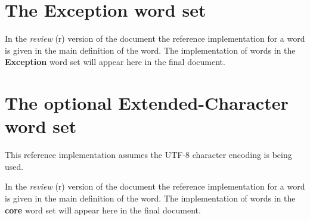 

\section{The Exception word set} %
\ifinline
	\begin{editor}
		In the \emph{review} (r) version of the document the
		reference implementation for a word is given in the main
		definition of the word.  The implementation of words in
		the \textbf{Exception} word set will appear here in the final
		document.
	\end{editor}
\else
	
\fi


\section{The optional Extended-Character word set} %
\label{imp:xchar}

This reference implementation assumes the UTF-8 character encoding
is being used.

\ifinline
	\begin{editor}
		In the \emph{review} (r) version of the document the
		reference implementation for a word is given in the main
		definition of the word.  The implementation of words
		in the \textbf{core} word set will appear here in the
		final document.
	\end{editor}
\else
	
\fi
